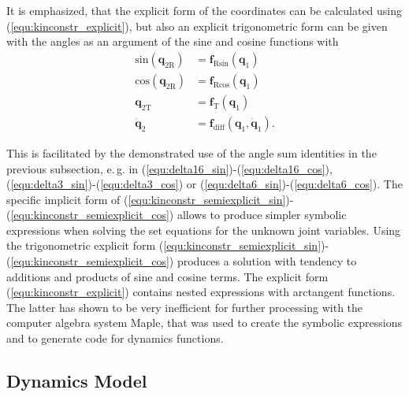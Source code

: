 \documentclass[letterpaper, 10 pt, conference]{ieeeconf}  %
\begin{document}
It is emphasized, that the explicit form of the coordinates can be calculated using (\ref{equ:kinconstr_explicit}), but also an explicit trigonometric form can be given with the angles as an argument of the sine and cosine functions with
%
\begin{align}
\mathrm{sin}(\bm{q}_{2\mathrm{R}}) &= \bm{f}_{\mathrm{R}\mathrm{sin}}(\bm{q}_1) \label{equ:kinconstr_semiexplicit_sin} \\
\mathrm{cos}(\bm{q}_{2\mathrm{R}}) &= \bm{f}_{\mathrm{R}\mathrm{cos}}(\bm{q}_1) \label{equ:kinconstr_semiexplicit_cos} \\
\bm{q}_{2\mathrm{T}} &= \bm{f}_{\mathrm{T}}(\bm{q}_1)  \label{equ:kinconstr_semiexplicit_transl} \\
\dot{\bm{q}}_2 &= \bm{f}_\mathrm{diff}(\bm{q}_1,\dot{\bm{q}}_1). \label{equ:kinconstr_semiexplicit_diff}
\end{align}
%

This is facilitated by the demonstrated use of the angle sum identities in the previous subsection, e.\,g. in (\ref{equ:delta16_sin})-(\ref{equ:delta16_cos}), (\ref{equ:delta3_sin})-(\ref{equ:delta3_cos}) or (\ref{equ:delta6_sin})-(\ref{equ:delta6_cos}).
The specific implicit form of (\ref{equ:kinconstr_semiexplicit_sin})-(\ref{equ:kinconstr_semiexplicit_cos}) allows to produce simpler symbolic expressions when solving the set equations for the unknown joint variables.
Using the trigonometric explicit form (\ref{equ:kinconstr_semiexplicit_sin})-(\ref{equ:kinconstr_semiexplicit_cos}) produces a solution with tendency to additions and products of sine and cosine terms.
The explicit form (\ref{equ:kinconstr_explicit}) contains nested expressions with arctangent functions.
The latter has shown to be very inefficient for further processing with the computer algebra system Maple, that was used to create the symbolic expressions and to generate code for dynamics functions.

%
%

\subsection{Dynamics Model}
\label{sec:Lagrange2Elim}
\end{document}
